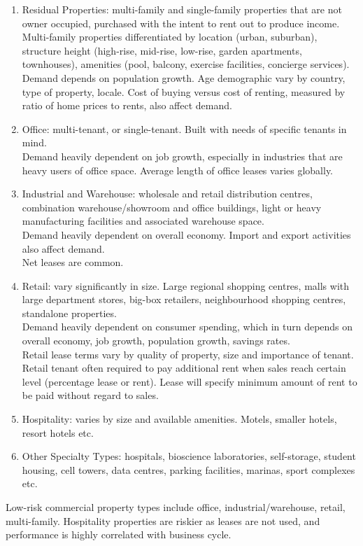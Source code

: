 \begin{remark} 
\begin{enumerate}[label=\roman*.]
\setlength{\itemsep}{0pt}
\item Residual Properties: multi-family and single-family properties that are not owner occupied, purchased with the intent to rent out to produce income.\\
Multi-family properties differentiated by location (urban, suburban), structure height (high-rise, mid-rise, low-rise, garden apartments, townhouses), amenities (pool, balcony, exercise facilities, concierge services).\\
Demand depends on population growth. Age demographic vary by country, type of property, locale. Cost of buying versus cost of renting, measured by ratio of home prices to rents, also affect demand.
\item Office: multi-tenant, or single-tenant. Built with needs of specific tenants in mind.\\
Demand heavily dependent on job growth, especially in industries that are heavy users of office space. Average length of office leases varies globally.
\item Industrial and Warehouse: wholesale and retail distribution centres, combination warehouse/showroom and office buildings, light or heavy manufacturing facilities and associated warehouse space.\\
Demand heavily dependent on overall economy. Import and export activities also affect demand.\\
Net leases are common.
\item Retail: vary significantly in size. Large regional shopping centres, malls with large department stores, big-box retailers, neighbourhood shopping centres, standalone properties.\\
Demand heavily dependent on consumer spending, which in turn depends on overall economy, job growth, population growth, savings rates.\\
Retail lease terms vary by quality of property, size and importance of tenant.\\
Retail tenant often required to pay additional rent when sales reach certain level (percentage lease or rent). Lease will specify minimum amount of rent to be paid without regard to sales. 
\item Hospitality: varies by size and available amenities. Motels, smaller hotels, resort hotels etc.
\item Other Specialty Types: hospitals, bioscience laboratories, self-storage, student housing, cell towers, data centres, parking facilities, marinas, sport complexes etc.
\end{enumerate}
Low-risk commercial property types include office, industrial/warehouse, retail, multi-family. Hospitality properties are riskier as leases are not used, and performance is highly correlated with business cycle.
\end{remark}

